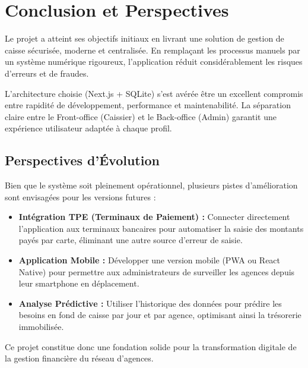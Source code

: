 \chapter{Conclusion et Perspectives}

Le projet \textbf{\projectName} a atteint ses objectifs initiaux en livrant une solution de gestion de caisse sécurisée, moderne et centralisée. En remplaçant les processus manuels par un système numérique rigoureux, l'application réduit considérablement les risques d'erreurs et de fraudes.

L'architecture choisie (Next.js + SQLite) s'est avérée être un excellent compromis entre rapidité de développement, performance et maintenabilité. La séparation claire entre le Front-office (Caissier) et le Back-office (Admin) garantit une expérience utilisateur adaptée à chaque profil.

\section*{Perspectives d'Évolution}
Bien que le système soit pleinement opérationnel, plusieurs pistes d'amélioration sont envisagées pour les versions futures :

\begin{itemize}
    \item \textbf{Intégration TPE (Terminaux de Paiement) :} Connecter directement l'application aux terminaux bancaires pour automatiser la saisie des montants payés par carte, éliminant une autre source d'erreur de saisie.
    \item \textbf{Application Mobile :} Développer une version mobile (PWA ou React Native) pour permettre aux administrateurs de surveiller les agences depuis leur smartphone en déplacement.
    \item \textbf{Analyse Prédictive :} Utiliser l'historique des données pour prédire les besoins en fond de caisse par jour et par agence, optimisant ainsi la trésorerie immobilisée.
\end{itemize}

Ce projet constitue donc une fondation solide pour la transformation digitale de la gestion financière du réseau d'agences.
